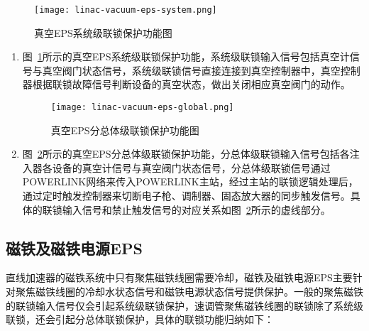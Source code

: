 \begin{figure}[!htb]
	\centering
	\texttt{[image: linac-vacuum-eps-system.png]}
	\caption{真空EPS系统级联锁保护功能图}
	\label{fig:linac-vacuum-eps-system}
\end{figure}

\begin{enumerate}
  \item 图~\ref{fig:linac-vacuum-eps-system}所示的真空EPS系统级联锁保护功能，系统级联锁输入信号包括真空计信号与真空阀门状态信号，系统级联锁信号直接连接到真空控制器中，真空控制器根据联锁故障信号判断设备的真空状态，做出关闭相应真空阀门的动作。

\begin{figure}[!htb]
	\centering
	\texttt{[image: linac-vacuum-eps-global.png]}
	\caption{真空EPS分总体级联锁保护功能图}
	\label{fig:linac-vacuum-eps-global}
\end{figure}

\item 图~\ref{fig:linac-vacuum-eps-global}所示的真空EPS分总体级联锁保护功能，分总体级联锁输入信号包括各注入器各设备的真空计信号与真空阀门状态信号，分总体级联锁信号通过POWERLINK网络来传入POWERLINK主站，经过主站的联锁逻辑处理后，通过定时触发控制器来切断电子枪、调制器、固态放大器的同步触发信号。具体的联锁输入信号和禁止触发信号的对应关系如图~\ref{fig:linac-vacuum-eps-global}所示的虚线部分。

\end{enumerate}

\subsection{磁铁及磁铁电源EPS}
直线加速器的磁铁系统中只有聚焦磁铁线圈需要冷却，磁铁及磁铁电源EPS主要针对聚焦磁铁线圈的冷却水状态信号和磁铁电源状态信号提供保护。一般的聚焦磁铁的联锁输入信号仅会引起系统级联锁保护，速调管聚焦磁铁线圈的联锁除了系统级联锁，还会引起分总体联锁保护，具体的联锁功能归纳如下：

